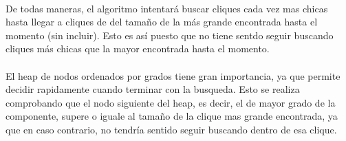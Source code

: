 \paragraph{}
De todas maneras, el algoritmo intentará buscar cliques cada vez mas chicas hasta llegar a cliques de del tamaño de la más grande encontrada hasta el momento (sin incluir). Esto es así puesto que no tiene sentdo seguir buscando cliques más chicas que la mayor encontrada hasta el momento. 

\paragraph{}
El heap de nodos ordenados por grados tiene gran importancia, ya que permite decidir rapidamente cuando terminar con la busqueda. Esto se realiza comprobando que el nodo siguiente del heap, es decir, el de mayor grado de la componente, supere o iguale al tamaño de la clique mas grande encontrada, ya que en caso contrario, no tendría sentido seguir buscando dentro de esa clique.

